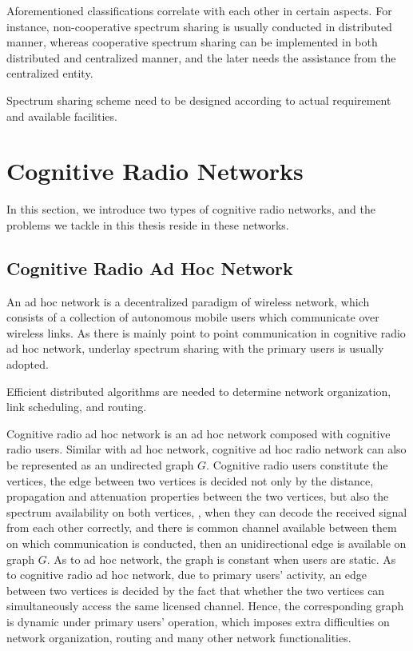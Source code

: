 Aforementioned classifications correlate with each other in certain aspects.
For instance, non-cooperative spectrum sharing is usually conducted in distributed manner, whereas cooperative spectrum sharing can be implemented in both distributed and centralized manner, and the later needs the assistance from the centralized entity.

Spectrum sharing scheme need to be designed according to actual requirement and available facilities.



\section{Cognitive Radio Networks}
In this section, we introduce two types of cognitive radio networks, and the problems we tackle in this thesis reside in these networks.

\subsection{Cognitive Radio Ad Hoc Network}
An ad hoc network is a decentralized paradigm of wireless network, which consists of a collection of autonomous mobile users which communicate over wireless links.
As there is mainly point to point communication in cognitive radio ad hoc network, underlay spectrum sharing with the primary users is usually adopted.

Efficient distributed algorithms are needed to determine network organization, link scheduling, and routing.



Cognitive radio ad hoc network is an ad hoc network composed with cognitive radio users.
Similar with ad hoc network, cognitive ad hoc radio network can also be represented as an undirected graph $G$.
Cognitive radio users constitute the vertices, the edge between two vertices is decided not only by the distance, propagation and attenuation properties between the two vertices, but also the spectrum availability on both vertices, \ie, when they can decode the received signal from each other correctly, and there is common channel available between them on which communication is conducted, then an unidirectional edge is available on graph $G$.
As to ad hoc network, the graph is constant when users are static.
As to cognitive radio ad hoc network, due to primary users' activity, an edge between two vertices is decided by the fact that whether the two vertices can simultaneously access the same licensed channel.
Hence, the corresponding graph is dynamic under primary users' operation, which imposes extra difficulties on network organization, routing and many other network functionalities.

